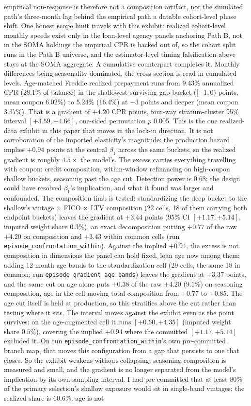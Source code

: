 \documentclass[12pt]{article}
\begin{document}
empirical non-response is therefore not a composition artifact, nor the simulated path's three-month lag behind the empirical path a datable cohort-level phase shift. One honest scope limit travels with this exhibit: realized cohort-level monthly speeds exist only in the loan-level agency panels anchoring Path B, not in the SOMA holdings the empirical CPR is backed out of, so the cohort split runs in the Path B universe, and the estimator-level timing falsification above stays at the SOMA aggregate. A cumulative counterpart completes it. Monthly differences being seasonality-dominated, the cross-section is read in cumulated levels. Age-matched Freddie realized prepayment runs from 9.43\% annualized CPR (28.1\% of balance) in the shallowest surviving gap bucket ($[-1,0)$ points, mean coupon 6.02\%) to 5.24\% (16.4\%) at $-3$ points and deeper (mean coupon 3.37\%). That is a gradient of $+4.20$ CPR points, four-way stratum-cluster 95\% interval $[+3.59, +4.66]$, one-sided permutation $p$ 0.005. This is the one realized-data exhibit in this paper that moves in the lock-in direction. It is not corroboration of the imported elasticity's magnitude: the production hazard implies $+0.94$ points at the central $\beta_1$ across the same buckets, so the realized gradient is roughly $4.5\times$ the model's. The excess carries everything travelling with coupon: credit composition, within-window refinancing on high-coupon shallow buckets, seasoning past the age cut. Detection power is 0.68: the design could have resolved $\beta_1$'s implication, and what it found was larger and confounded. The composition limb is tested: standardizing the deep bucket to the shallow's vintage $\times$ FICO $\times$ LTV composition (22 cells, 18 of them carrying both endpoint buckets) leaves the gradient at $+3.44$ points (95\% CI $[+1.17, +5.14]$, imputed weight share $0.3\%$), an exact decomposition putting $+0.77$ of the raw $+4.20$ on composition and $+3.43$ within common cells (run \texttt{episode\_confrontation\_within}). Against the implied $+0.94$, the excess is not composition in dimensions the panel can hold fixed, loan age now among them: adding 12-month age bands to the standardization cell (29 cells, the same 18 in common; run \texttt{episode\_gradient\_age\_bands}) leaves the gradient at $+3.37$ points, and the same cut on age alone puts $+0.38$ of the raw $+4.20$ ($9.1\%$) on seasoning composition, age in the cell moving total composition from $+0.77$ to $+0.85$. The age cut itself is held at production, so this stratifies above the cut rather than testing where it sits. The interval moves against the exhibit even as the point survives: on the age-augmented cell it runs $[+0.60, +4.35]$ (imputed weight share $0.5\%$), covering the implied $+0.94$ where the committed $[+1.17, +5.14]$ excluded it. On run \texttt{episode\_confrontation\_within}'s own pre-committed branch map, that moves this configuration from a gap that persists to one that closes. So the exhibit weakens without collapsing: seasoning composition is measured and small, and the gradient is no longer separated from the model's implication by its own sampling interval. I had pre-committed that at least $80\%$ of the primary selection's shallow exposure would sit in single-band vintages; the realized share is $60.6\%$: age is not 
\end{document}
